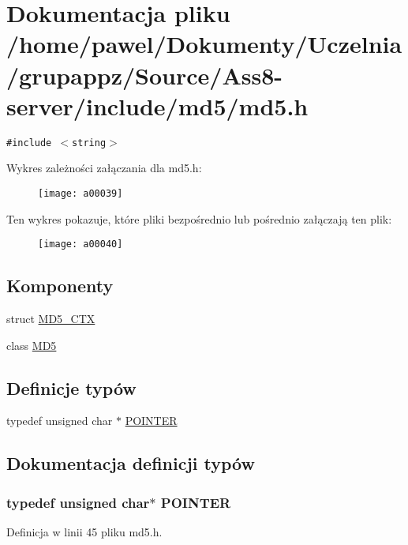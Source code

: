 \hypertarget{a00010}{
\section{Dokumentacja pliku /home/pawel/Dokumenty/Uczelnia/grupappz/Source/Ass8-server/include/md5/md5.h}
\label{a00010}
}
{\tt \#include $<$string$>$}\par


Wykres zależności załączania dla md5.h:\nopagebreak
\begin{figure}[H]
\begin{center}
\leavevmode
\texttt{[image: a00039]}
\end{center}
\end{figure}


Ten wykres pokazuje, które pliki bezpośrednio lub pośrednio załączają ten plik:\nopagebreak
\begin{figure}[H]
\begin{center}
\leavevmode
\texttt{[image: a00040]}
\end{center}
\end{figure}
\subsection*{Komponenty}
\begin{CompactItemize}
\item 
struct \hyperlink{a00003}{MD5\_\-CTX}
\item 
class \hyperlink{a00002}{MD5}
\end{CompactItemize}
\subsection*{Definicje typów}
\begin{CompactItemize}
\item 
typedef unsigned char $\ast$ \hyperlink{a00010_73204e40637f83518fb695362ea084a4}{POINTER}
\end{CompactItemize}


\subsection{Dokumentacja definicji typów}
\hypertarget{a00010_73204e40637f83518fb695362ea084a4}{
\subsubsection[{POINTER}]{\setlength{\rightskip}{0pt plus 5cm}typedef unsigned char$\ast$ {\bf POINTER}}}
\label{a00010_73204e40637f83518fb695362ea084a4}




Definicja w linii 45 pliku md5.h.